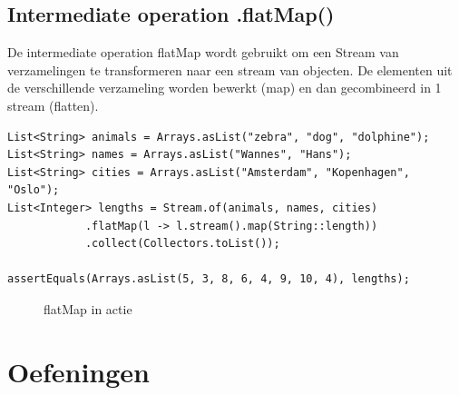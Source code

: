 \documentclass{tstextbook}
\begin{document}
\subsection{Intermediate operation .flatMap()}

De intermediate operation flatMap wordt gebruikt om een Stream van verzamelingen te transformeren naar een stream van objecten. De elementen uit de verschillende verzameling worden bewerkt (map) en dan gecombineerd in 1 stream (flatten).

\begin{lstlisting}
List<String> animals = Arrays.asList("zebra", "dog", "dolphine");
List<String> names = Arrays.asList("Wannes", "Hans");
List<String> cities = Arrays.asList("Amsterdam", "Kopenhagen", "Oslo");
List<Integer> lengths = Stream.of(animals, names, cities)
		    .flatMap(l -> l.stream().map(String::length))
		    .collect(Collectors.toList());

assertEquals(Arrays.asList(5, 3, 8, 6, 4, 9, 10, 4), lengths);
\end{lstlisting}

\begin{figure}[H]
\caption{flatMap in actie}
\label{fig:stream_flatmap}
\end{figure}

\section{Oefeningen}
\end{document}
